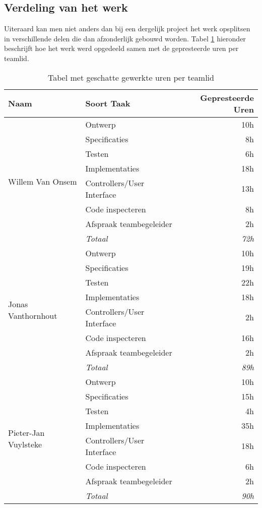\subsection{Verdeling van het werk}
Uiteraard kan men niet anders dan bij een dergelijk project het werk opsplitsen in verschillende delen die dan afzonderlijk gebouwd worden. Tabel \ref{tbl:workedHours} hieronder beschrijft hoe het werk werd opgedeeld samen met de gepresteerde uren per teamlid.
\begin{table}[H]
\centering
\begin{tabular}{|l|l|r|}
\hline
\textbf{Naam}&\textbf{Soort Taak}&\textbf{Gepresteerde Uren}\\\hline\hline
\multirow{8}{*}{Willem Van Onsem}&Ontwerp&10h\\
&Specificaties&8h\\
&Testen&6h\\
&Implementaties&18h\\
&Controllers/User Interface&13h\\
&Code inspecteren&8h\\
&Afspraak teambegeleider&2h\\
&\textit{Totaal}&\textit{72h}\\\hline
\multirow{8}{*}{Jonas Vanthornhout}&Ontwerp&10h\\
&Specificaties&19h\\
&Testen&22h\\
&Implementaties&18h\\
&Controllers/User Interface&2h\\
&Code inspecteren&16h\\
&Afspraak teambegeleider&2h\\
&\textit{Totaal}&\textit{89h}\\\hline
\multirow{8}{*}{Pieter-Jan Vuylsteke}&Ontwerp&10h\\
&Specificaties&15h\\
&Testen&4h\\
&Implementaties&35h\\
&Controllers/User Interface&18h\\
&Code inspecteren&6h\\
&Afspraak teambegeleider&2h\\
&\textit{Totaal}&\textit{90h}\\\hline
\end{tabular}
\caption{Tabel met geschatte gewerkte uren per teamlid}
\label{tbl:workedHours}
\end{table}
